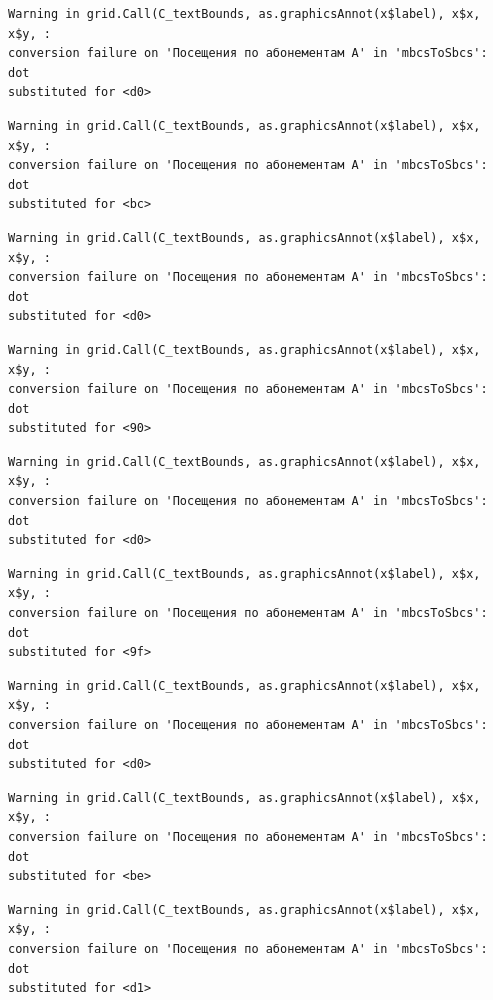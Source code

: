 \documentclass[
  letterpaper,
  DIV=11,
  numbers=noendperiod]{scrartcl}
\begin{document}
\begin{verbatim}
Warning in grid.Call(C_textBounds, as.graphicsAnnot(x$label), x$x, x$y, :
conversion failure on 'Посещения по абонементам А' in 'mbcsToSbcs': dot
substituted for <d0>
\end{verbatim}

\begin{verbatim}
Warning in grid.Call(C_textBounds, as.graphicsAnnot(x$label), x$x, x$y, :
conversion failure on 'Посещения по абонементам А' in 'mbcsToSbcs': dot
substituted for <bc>
\end{verbatim}

\begin{verbatim}
Warning in grid.Call(C_textBounds, as.graphicsAnnot(x$label), x$x, x$y, :
conversion failure on 'Посещения по абонементам А' in 'mbcsToSbcs': dot
substituted for <d0>
\end{verbatim}

\begin{verbatim}
Warning in grid.Call(C_textBounds, as.graphicsAnnot(x$label), x$x, x$y, :
conversion failure on 'Посещения по абонементам А' in 'mbcsToSbcs': dot
substituted for <90>
\end{verbatim}

\begin{verbatim}
Warning in grid.Call(C_textBounds, as.graphicsAnnot(x$label), x$x, x$y, :
conversion failure on 'Посещения по абонементам А' in 'mbcsToSbcs': dot
substituted for <d0>
\end{verbatim}

\begin{verbatim}
Warning in grid.Call(C_textBounds, as.graphicsAnnot(x$label), x$x, x$y, :
conversion failure on 'Посещения по абонементам А' in 'mbcsToSbcs': dot
substituted for <9f>
\end{verbatim}

\begin{verbatim}
Warning in grid.Call(C_textBounds, as.graphicsAnnot(x$label), x$x, x$y, :
conversion failure on 'Посещения по абонементам А' in 'mbcsToSbcs': dot
substituted for <d0>
\end{verbatim}

\begin{verbatim}
Warning in grid.Call(C_textBounds, as.graphicsAnnot(x$label), x$x, x$y, :
conversion failure on 'Посещения по абонементам А' in 'mbcsToSbcs': dot
substituted for <be>
\end{verbatim}

\begin{verbatim}
Warning in grid.Call(C_textBounds, as.graphicsAnnot(x$label), x$x, x$y, :
conversion failure on 'Посещения по абонементам А' in 'mbcsToSbcs': dot
substituted for <d1>
\end{verbatim}
\end{document}
